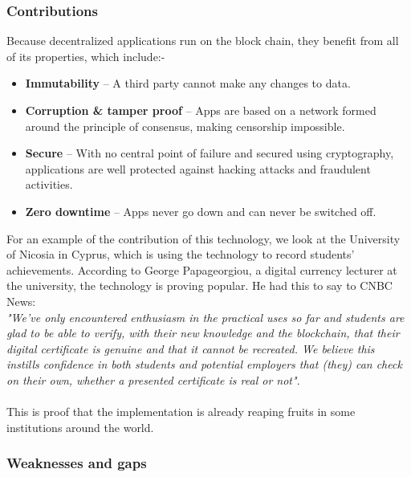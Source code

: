 \subsubsection{Contributions}

Because decentralized applications run on the block chain, they benefit from all of its properties, which include:-\\
\begin{itemize}
\item \textbf{Immutability} – A third party cannot make any changes to data.
\item \textbf{Corruption \& tamper proof} – Apps are based on a network formed around the principle of consensus, making censorship impossible.
\item \textbf{Secure} – With no central point of failure and secured using cryptography, applications are well protected against hacking attacks and fraudulent activities.
\item \textbf{Zero downtime} – Apps never go down and can never be switched off.

\end{itemize}

For an example of the contribution of this technology, we look at the University of Nicosia in Cyprus, which is using the technology to record students' achievements. According to George Papageorgiou, a digital currency lecturer at the university, the technology is proving popular. He had this to say to CNBC News: \\ 
\textit{"We've only encountered enthusiasm in the practical uses so far and students are glad to be able to verify, with their new knowledge and the blockchain, that their digital certificate is genuine and that it cannot be recreated.
We believe this instills confidence in both students and potential employers that (they) can check on their own, whether a presented certificate is real or not"}.\cite{art5} \\ \\
This is proof that the implementation is already reaping fruits in some institutions around the world.



\subsubsection{Weaknesses and gaps}

